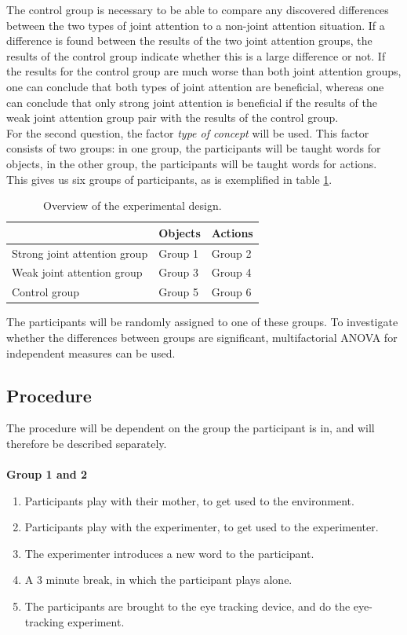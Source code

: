 \documentclass[12pt]{article}
\begin{document}
The control group is necessary to be able to compare any discovered differences between the two types of joint attention to a non-joint attention situation. If a difference is found between the results of the two joint attention groups, the results of the control group indicate whether this is a large difference or not. If the results for the control group are much worse than both joint attention groups, one can conclude that both types of joint attention are beneficial, whereas one can conclude that only strong joint attention is beneficial if the results of the weak joint attention group pair with the results of the control group.\\\indent
For the second question, the factor \emph{type of concept} will be used. This factor consists of two groups: in one group, the participants will be taught words for objects, in the other group, the participants will be taught words for actions. \\\indent
This gives us six groups of participants, as is exemplified in table \ref{overview}.

\begin{table}[h] 
\begin{tabular}{|l||l|l|}
\hline
&Objects&Actions\\
\hline
\hline
Strong joint attention group&Group 1&Group 2\\
\hline
Weak joint attention group&Group 3&Group 4\\
\hline
Control group&Group 5&Group 6\\
\hline
\end{tabular}
\caption{Overview of the experimental design.}
\label{overview}
\end{table}

The participants will be randomly assigned to one of these groups. To investigate whether the differences between groups are significant, multifactorial ANOVA for independent measures can be used.

\subsection{Procedure}

The procedure will be dependent on the group the participant is in, and will therefore be described separately.\\\\\indent
\textbf{Group 1 and 2}
\begin{enumerate}
\item Participants play with their mother, to get used to the environment.
\item Participants play with the experimenter, to get used to the experimenter.
\item The experimenter introduces a new word to the participant.
\item A 3 minute break, in which the participant plays alone.
\item The participants are brought to the eye tracking device, and do the eye-tracking experiment.
\end{enumerate}
\end{document}
